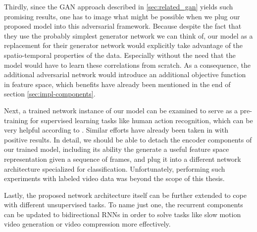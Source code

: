 Thirdly, since the GAN approach described in \ref{sec:related_gan} yields such promising results, one has to image what might be possible when we plug our proposed model into this adversarial framework. Because despite the fact that they use the probably simplest generator network we can think of, our model as a replacement for their generator network would explicitly take advantage of the spatio-temporal properties of the data. Especially without the need that the model would have to learn these correlations from scratch. As a consequence, the additional adversarial network would introduce an additional objective function in feature space, which benefits have already been mentioned in the end of section \ref{sec:impl-components}.

Next, a trained network instance of our model can be examined to serve as a pre-training for supervised learning tasks like human action recognition, which can be very helpful according to \parencite[p. 20]{deep_arch_ai}. Similar efforts have already been taken in \parencite{unsup_learn_lstm} with positive results. In detail, we should be able to detach the encoder components of our trained model, including its ability the generate a useful feature space representation given a sequence of frames, and plug it into a different network architecture specialized for classification. Unfortunately, performing such experiments with labeled video data was beyond the scope of this thesis.

Lastly, the proposed network architecture itself can be further extended to cope with different unsupervised tasks. To name just one, the recurrent components can be updated to bidirectional RNNs in order to solve tasks like slow motion video generation or video compression more effectively.